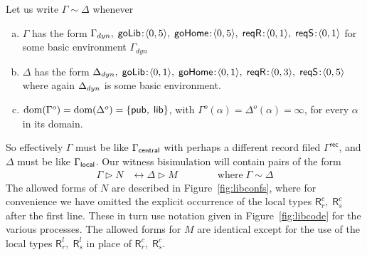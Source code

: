 \documentclass{LMCS}
\newcommand{\with}{\mathbin \rhd}
\newcommand{\record}{{\scriptstyle \mathsf{rec}}}
\newcommand{\Gammadyn}{\Gamma_{\scriptstyle dyn}}
\def\pair(#1,#2){\langle #1 , #2 \rangle}\newcommand{\parrow}{ \mathbin{\rightharpoonup}}
\newcommand{\dom}[1]{\mathop{\text{dom}}(#1)}
\newcommand{\typeletter}[1]{{\mathsf{#1}}}
\newcommand{\tR}{\typeletter{R}}
\newcommand{\Cassoc}[2]{ {{#1}\kern -0.2em : \kern -0.2em {#2}}}
\begin{document}
Let us write $\Gamma \sim \Delta$ whenever
\begin{enumerate}[(a)]
\item $\Gamma$ has the form 
  \begin{math}
     \Gammadyn,\; \Cassoc{\goLib}{\pair(0,5)},\;\Cassoc{\goHome}{\pair(0,5)},\;
    \Cassoc{\reqR}{\pair(0,1)},\;\Cassoc{\reqS}{\pair(0,1)}
  \end{math}
for some basic environment  $\Gammadyn$ 



\item $\Delta$ has the form 
  \begin{math}
     \Deltadyn,\; \Cassoc{\goLib}{\pair(0,1)},\;\Cassoc{\goHome}{\pair(0,1)},\;
    \Cassoc{\reqR}{\pair(0,3)},\;\Cassoc{\reqS}{\pair(0,5)}
  \end{math}
where again $\Delta_{\scriptstyle dyn}$ is 
some basic environment. 

\item $\dom{\Gamma^o} = \dom{\Delta^o} = \sset{ \Cpublic,\; \Clib}$, with $\Gamma^o(\alpha) = \Delta^o(\alpha) = \infty$, for
every $\alpha$ in its domain. 
\end{enumerate}
So effectively $\Gamma$ must be like $\Gamma_{\mathsf{central}}$ with perhaps a different 
record filed $\Gamma^{\record}$, and $\Delta$ must be like $\Gamma_{\mathsf{local}}$. 
Our witness bisimulation will contain pairs of
the form 
\begin{align*}
  \Gamma \with N &\leftrightarrow \Delta \with M   \qquad\qquad \text{where}\; \Gamma \sim \Delta
\end{align*}
The allowed forms of $N$ are described in Figure~\ref{fig:libconfs}, where for convenience we have omitted 
the explicit occurrence of the local types $\tR^c_r,\; \tR^c_s$ after the first line. These in turn use 
notation given in Figure~\ref{fig:libcode} for the various processes.  
The allowed forms for $M$ are identical  except for the use of the local types 
$\tR^l_r,\; \tR^l_s$ in place of $\tR^c_r,\; \tR^c_s$.
\end{document}
